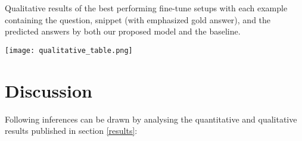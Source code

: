 \documentclass[acmsmall]{acmart}
\begin{document}
\begin{table}

\caption{Qualitative results of the best performing fine-tune setups with each example containing the question, snippet (with emphasized gold answer), and the predicted answers by both our proposed model and the baseline.} 








\texttt{[image: qualitative\_table.png]}
 \label{tab:squad_qualt}
 \end{table}

\section{Discussion}
Following inferences can be drawn by analysing the quantitative and qualitative results published in section \ref{results}:
\end{document}
